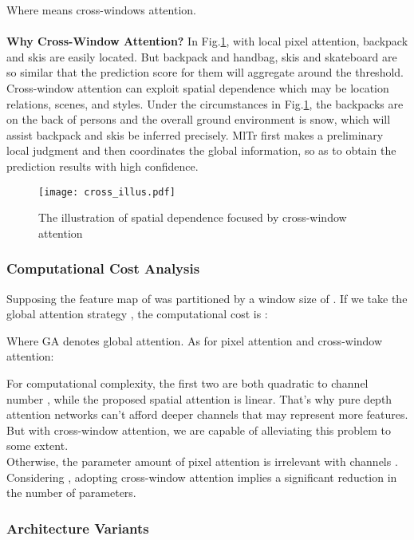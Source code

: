 \documentclass{article} \usepackage[numbers,sort&compress]{natbib}
\begin{document}
Where  means cross-windows attention.\\\\
\textbf{Why Cross-Window Attention?} 
In Fig.\ref{cross_illus}, with local pixel attention, backpack and skis are easily located. But backpack and handbag, skis and skateboard are so similar that the prediction score for them will aggregate around the threshold. Cross-window attention can exploit spatial dependence which may be location relations, scenes, and styles. Under the circumstances in Fig.\ref{cross_illus},  the backpacks are on the back of persons and the overall ground environment is snow, which will assist backpack and skis be inferred precisely. MlTr first makes a preliminary local judgment and then coordinates the global information, so as to obtain the prediction results with high confidence.
\begin{figure}[h]
\begin{center}
\texttt{[image: cross\_illus.pdf]}
\caption{The illustration of spatial dependence focused by cross-window attention}
\label{cross_illus}
\end{center}
\end{figure}
\subsubsection{Computational Cost Analysis}
\label{compute_cost}
Supposing the feature map of  was partitioned by a window size of . If we take the global attention strategy \cite{vaswani2017attention}, the computational cost is \cite{liu2021swin, han2021transformer}:

Where GA denotes global attention. As for pixel attention and cross-window attention:


For computational complexity, the first two are both quadratic to channel number , while the proposed spatial attention is linear. That's why pure depth attention networks can't afford deeper channels that may represent more features. But with cross-window attention, we are capable of alleviating this problem to some extent.\\
Otherwise, the parameter amount of pixel attention is irrelevant with channels . Considering , adopting cross-window attention implies a significant reduction in the number of parameters.


\subsubsection{Architecture Variants}
\end{document}
